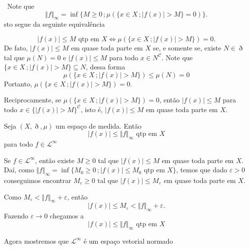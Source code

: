 \documentclass[a4paper, 11pt]{book}
\theoremstyle{definition}
\newcommand{\obs}{\noindent{\textbf{\textcolor{black}{\sffamily Observação:}}}~}
\newcommand{\cC}{\mathcal{C}}
\newcommand{\cL}{\mathcal{L}}
\begin{document}
\obs Note que
\[
    \Vert f \Vert_\infty = \inf \{M \geqslant 0 \,; \mu(\{x \in X \,; |f(x)| > M\} = 0)\}.
\]
sto segue da seguinte equivalência

\[
    |f(x)| \leqslant M \text{ qtp em } X \iff \mu(\{x \in X \,; |f(x)| > M\}) = 0.
\]
De fato, $|f(x)| \leqslant M$ em quase toda parte em $X$ se, e somente se, existe $N \in \eth$ tal que $\mu(N) = 0$ e $|f(x)| \leqslant M$ para todo $x \in N^\cC$.
Note que $\{ x \in X \,; |f(x)| > M\} \subseteq N$, dessa forma
\[
    \mu(\{x \in X\,; |f(x)| > M\}) \leqslant \mu(N) = 0
\]
Portanto, $\mu(\{x \in X\,; |f(x)| > M\}) = 0$.

Reciprocamente, se $\mu(\{x \in X\,; |f(x)| > M\}) = 0$, então $|f(x)| \leqslant M$ para todo $x \in \{|f(x)| > M\}^{\cC}$, isto é, $|f(x)| \leqslant M$ em quase toda parte em $X$.

\begin{pbox}
    Seja $(X,\eth,\mu)$ um espaço de medida.
    Então
    \[
        |f(x)| \leqslant \Vert f \Vert_\infty \text{ qtp em } X
    \]
    para todo $f \in \cL^\infty$
\end{pbox}
\begin{prf}
    Se $f \in \cL^\infty$, então existe $M \geqslant 0$ tal que $|f(x)| \leqslant M$ em quase toda parte em $X$.
    Daí, como $\Vert f \Vert_\infty = \inf \{ M_0 \geqslant 0 \,; |f(x)| \leqslant M_0 \text{ qtp em } X\}$, temos que dado $\varepsilon > 0$ conseguimos encontrar $M_\varepsilon \geqslant 0$ tal que $|f(x)| \leqslant M_\varepsilon$ em quase toda parte em $X$.
    \begin{center}
    \end{center}
    Como $M_\varepsilon < \Vert f \Vert_\infty + \varepsilon$, então
    \[
        |f(x)| \leqslant M_\varepsilon < \Vert f \Vert_\infty +  \varepsilon.
    \]
    Fazendo $\varepsilon \to 0$ chegamos a
    \[
        |f(x)| \leqslant \Vert f \Vert_\infty \text{ qtp em } X
    \]
\end{prf}

Agora mostremos que $\cL^\infty$ é um espaço vetorial normado
\end{document}
